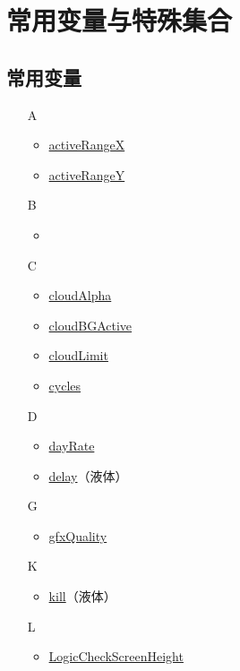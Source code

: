 \chapter{常用变量与特殊集合}
\section{常用变量}
\begin{multicols}{2}[]
{\ttfamily
\begin{itemize}
\item[A] \begin{itemize}
	\item \hyperref[tab9]{activeRangeX}
	\item \hyperref[tab9]{activeRangeY}
	\end{itemize}
\item[B] \begin{itemize}
	\item \hyperref[sec9]{}
	\end{itemize}
\item[C] \begin{itemize}
	\item \href{https://www.bbstr.net/threads/133/#post-623}{cloudAlpha}
	\item \href{https://www.bbstr.net/threads/133/#post-623}{cloudBGActive}
	\item \href{https://www.bbstr.net/threads/133/#post-623}{cloudLimit}
	\item \hyperref[tab10]{cycles}
	\end{itemize}
\item[D] \begin{itemize}
	\item \href{https://www.bbstr.net/threads/133/#post-623}{dayRate}
	\item \hyperref[tab10]{delay}（液体）
	\end{itemize}
\item[G] \begin{itemize}
	\item \hyperref[app34]{gfxQuality}
	\end{itemize}
\item[K] \begin{itemize}
	\item \hyperref[tab10]{kill}（液体）
	\end{itemize}
\item[L] \begin{itemize}
	\item \hyperref[tab9]{LogicCheckScreenHeight}

\end{itemize}
\end{itemize}}
\end{multicols}
